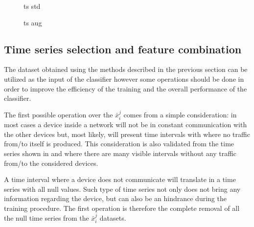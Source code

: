 \begin{figure}
    \centering

\caption{ts std}
    \label{fig:ts_std}
\end{figure}


\begin{figure}
    \centering

\caption{ts aug}
    \label{fig:ts_aug}
\end{figure}

\subsection{Time series selection and feature combination}

The dataset obtained using the methods described in the previous section can be utilized as the input of the classifier however some operations should be done in order to improve the efficiency of the training and the overall performance of the classifier.

The first possible operation over the $\bar{x}_i^j$ comes from a simple consideration: in most cases a device inside a network will not be in constant communication with the other devices but, most likely, will present time intervals with where no traffic from/to itself is produced. This consideration is also validated from the time series shown in  and  where there are many visible intervals without any traffic from/to the considered devices.

A time interval where a device does not communicate will translate in a time series with all null values. Such type of time series not only does not bring any information regarding the device, but can also be an hindrance during the training procedure. The first operation is therefore the complete removal of all the null time series from the $\bar{x}_i^j$ datasets.


